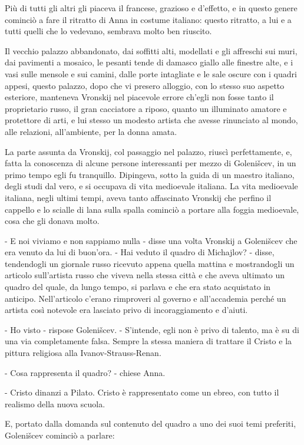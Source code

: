 Più di tutti gli altri gli piaceva il francese, grazioso e d'effetto, e in questo genere cominciò a fare il ritratto di Anna in costume italiano: questo ritratto, a lui e a tutti quelli che lo vedevano, sembrava molto ben riuscito. 

Il vecchio palazzo abbandonato, dai soffitti alti, modellati e gli affreschi sui muri, dai pavimenti a mosaico, le pesanti tende di damasco giallo alle finestre alte, e i vasi sulle mensole e sui camini, dalle porte intagliate e le sale oscure con i quadri appesi, questo palazzo, dopo che vi presero alloggio, con lo stesso suo aspetto esteriore, manteneva Vronskij nel piacevole errore ch'egli non fosse tanto il proprietario russo, il gran cacciatore a riposo, quanto un illuminato amatore e protettore di arti, e lui stesso un modesto artista che avesse rinunciato al mondo, alle relazioni, all'ambiente, per la donna amata. 

La parte assunta da Vronskij, col passaggio nel palazzo, riuscì perfettamente, e, fatta la conoscenza di alcune persone interessanti per mezzo di Golenišcev, in un primo tempo egli fu tranquillo. Dipingeva, sotto la guida di un maestro italiano, degli studi dal vero, e si occupava di vita medioevale italiana. La vita medioevale italiana, negli ultimi tempi, aveva tanto affascinato Vronskij che perfino il cappello e lo scialle di lana sulla spalla cominciò a portare alla foggia medioevale, cosa che gli donava molto. 

- E noi viviamo e non sappiamo nulla - disse una volta Vronskij a Golenišcev che era venuto da lui di buon'ora. - Hai veduto il quadro di Michajlov? - disse, tendendogli un giornale russo ricevuto appena quella mattina e mostrandogli un articolo sull'artista russo che viveva nella stessa città e che aveva ultimato un quadro del quale, da lungo tempo, si parlava e che era stato acquistato in anticipo. Nell'articolo c'erano rimproveri al governo e all'accademia perché un artista così notevole era lasciato privo di incoraggiamento e d'aiuti. 

- Ho visto - rispose Golenišcev. - S'intende, egli non è privo di talento, ma è su di una via completamente falsa. Sempre la stessa maniera di trattare il Cristo e la pittura religiosa alla Ivanov-Strauss-Renan. 

- Cosa rappresenta il quadro? - chiese Anna. 

- Cristo dinanzi a Pilato. Cristo è rappresentato come un ebreo, con tutto il realismo della nuova scuola. 

E, portato dalla domanda sul contenuto del quadro a uno dei suoi temi preferiti, Golenišcev cominciò a parlare: 

